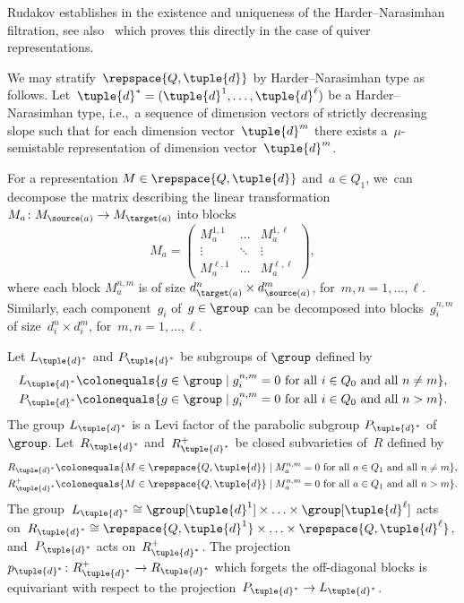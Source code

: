 Rudakov establishes in \cite[Th.\,3]{MR1480783} the existence
and uniqueness
of the Harder--Nara\-sim\-han filtration,
see also~\cite[Th.\,2.5]{MR1906875} which proves this directly
in the case of quiver representations.

We may stratify~$\repspace{Q,\tuple{d}}$ by Harder--Narasimhan type as follows.
Let~$\tuple{d}^* = (\tuple{d}^1,\ldots,\tuple{d}^\ell)$ be a Harder--Narasimhan type,
i.e.,~a sequence of dimension vectors of strictly decreasing slope
such that for each dimension vector~$\tuple{d}^m$
there exists a~$\mu$\nobreakdash-semistable representation of dimension vector~$\tuple{d}^m$.

For a representation $M \in \repspace{Q,\tuple{d}}$
and~$a\in Q_1$, we~can decompose the matrix
describing the linear transformation~$M_a\colon M_{\source(a)}\to M_{\target(a)}$ into blocks
\begin{equation}
\label{equation:shape-matrix-HN-blocks}
M_a =
\left(
\begin{matrix}
M_a^{1,1} & \hdots & M_a^{1,\ell} \\
\vdots & \ddots & \vdots \\
M_a^{\ell,1} & \hdots & M_a^{\ell,\ell}
\end{matrix}
\right),
\end{equation}
where each block $M_a^{n,m}$ is of size $d^n_{\target(a)} \times d^m_{\source(a)}$,
for~$m,n=1,\ldots,\ell$.
Similarly, each component~$g_i$ of~$g \in \group$
can be decomposed into blocks~$g_i^{n,m}$ of size~$d^n_i \times d^m_i$,
for~$m,n=1,\ldots,\ell$.

Let $L_{\tuple{d}^*}$ and $P_{\tuple{d}^*}$ be subgroups of ${\group}$ defined by
\begin{align*}
L_{\tuple{d}^*} &\colonequals \{ g \in \group \mid g_i^{n,m} = 0 \text{ for all $i \in Q_0$ and all $n \neq m$}\}, \\
P_{\tuple{d}^*} &\colonequals \{ g \in \group \mid g_i^{n,m} = 0 \text{ for all $i \in Q_0$ and all $n > m$}\}.
\end{align*}
The group $L_{\tuple{d}^*}$ is a Levi factor of the parabolic subgroup $P_{\tuple{d}^*}$ of $\group$.
Let~$R_{\tuple{d}^*}$ and~$R_{\tuple{d}^*}^+$ be closed subvarieties of~$R$ defined by
\begin{equation}\label{equation:upper-triangular}
\begin{aligned}
R_{\tuple{d}^*} &\colonequals \{ M \in \repspace{Q,\tuple{d}} \mid M_a^{n,m} = 0 \text{ for all $a \in Q_1$ and all $n \neq m$}\}, \\
R_{\tuple{d}^*}^+ &\colonequals \{ M \in \repspace{Q,\tuple{d}} \mid M_a^{n,m} = 0 \text{ for all $a \in Q_1$ and all $n > m$}\}.
\end{aligned}
\end{equation}
The group~$L_{\tuple{d}^*} \cong \group[\tuple{d}^1] \times \ldots \times \group[\tuple{d}^\ell]$
acts on~$R_{\tuple{d}^*} \cong \repspace{Q,\tuple{d}^1} \times \ldots \times \repspace{Q,\tuple{d}^\ell}$,
and~$P_{\tuple{d}^*}$ acts on~$R_{\tuple{d}^*}^+$.
The projection~$p_{\tuple{d}^*}\colon R_{\tuple{d}^*}^+ \to R_{\tuple{d}^*}$
which forgets the off-diagonal blocks is equivariant with respect to the projection~$P_{\tuple{d}^*} \to L_{\tuple{d}^*}$.

